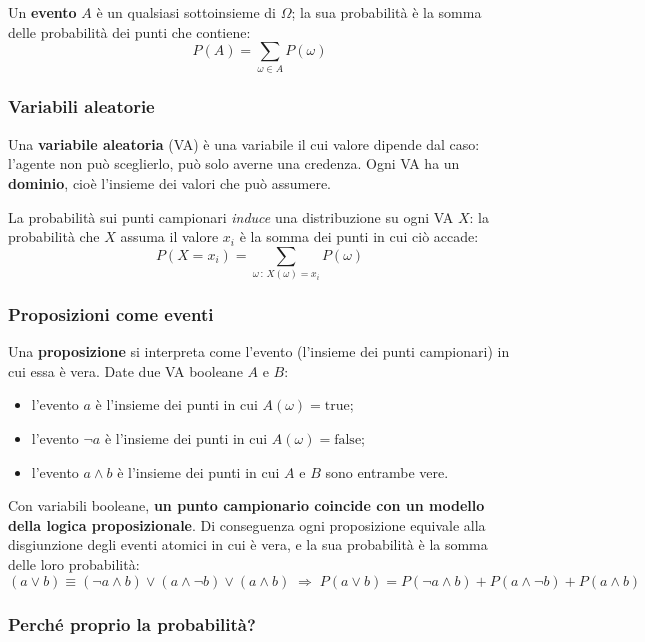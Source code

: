 \documentclass[11pt, a4paper]{article}
\renewcommand{\emph}[1]{\textcolor{verdechiaro}{\itshape #1}}
\begin{document}
Un \textbf{evento} $A$ è un qualsiasi sottoinsieme di $\Omega$; la sua probabilità è la somma delle probabilità dei punti che contiene:
\[
  P(A) = \sum_{\omega \in A} P(\omega)
\]

\subsubsection*{Variabili aleatorie}

Una \textbf{variabile aleatoria} (VA) è una variabile il cui valore dipende dal caso: l'agente non può sceglierlo, può solo averne una credenza. Ogni VA ha un \textbf{dominio}, cioè l'insieme dei valori che può assumere.

La probabilità sui punti campionari \emph{induce} una distribuzione su ogni VA $X$: la probabilità che $X$ assuma il valore $x_i$ è la somma dei punti in cui ciò accade:
\[
  P(X = x_i) = \sum_{\omega \,:\, X(\omega) = x_i} P(\omega)
\]

\subsubsection*{Proposizioni come eventi}

Una \textbf{proposizione} si interpreta come l'evento (l'insieme dei punti campionari) in cui essa è vera. Date due VA booleane $A$ e $B$:
\begin{itemize}
  \item l'evento $a$ è l'insieme dei punti in cui $A(\omega) = \text{true}$;
  \item l'evento $\lnot a$ è l'insieme dei punti in cui $A(\omega) = \text{false}$;
  \item l'evento $a \land b$ è l'insieme dei punti in cui $A$ e $B$ sono entrambe vere.
\end{itemize}

Con variabili booleane, \textbf{un punto campionario coincide con un modello della logica proposizionale}. Di conseguenza ogni proposizione equivale alla disgiunzione degli eventi atomici in cui è vera, e la sua probabilità è la somma delle loro probabilità:
\[
  (a \lor b) \equiv (\lnot a \land b) \lor (a \land \lnot b) \lor (a \land b)
  \;\Longrightarrow\;
  P(a \lor b) = P(\lnot a \land b) + P(a \land \lnot b) + P(a \land b)
\]

\subsubsection*{Perché proprio la probabilità?}
\end{document}
